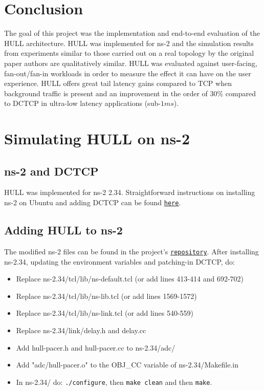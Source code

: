 \documentclass[10pt,conference,compsocconf]{IEEEtran}
\begin{document}
\section{Conclusion}
The goal of this project was the implementation and end-to-end evaluation of the HULL architecture. HULL was implemented for ns-2 and the simulation results from experiments similar to those carried out on a real topology by the original paper authors are qualitatively similar. HULL was evaluated against user-facing, fan-out/fan-in workloads in order to measure the effect it can have on the user experience. HULL offers great tail latency gains compared to TCP when background traffic is present and an improvement in the order of $30\%$ compared to DCTCP in ultra-low latency applications (sub-$1ms$).
\vspace{15pt}








\vspace{15pt}
\appendix

\section*{Simulating HULL on ns-2}

\subsection{ns-2 and DCTCP}
HULL was implemented for ns-2 2.34. Straightforward instructions on installing ns-2 on Ubuntu and adding DCTCP can be found \href{https://www.cl.cam.ac.uk/research/srg/netos/qjump/nsdi2015/figure9.html}{\texttt{here}}.

\subsection{Adding HULL to ns-2}
The modified ns-2 files can be found in the project's \href{https://github.com/konspras/Implementation-and-end-to-end-Evaluation-of-the-HULL-Architecture}{\texttt{repository}}. After installing ns-2.34, updating the environment variables and patching-in DCTCP, do:
\begin{itemize}
    \item Replace ns-2.34/tcl/lib/ns-default.tcl (or add lines 413-414 and 692-702)
    \item Replace ns-2.34/tcl/lib/ns-lib.tcl (or add lines 1569-1572)
    \item Replace ns-2.34/tcl/lib/ns-link.tcl (or add lines 540-559)
    \item Replace ns-2.34/link/delay.h and delay.cc
    \item Add hull-pacer.h and hull-pacer.cc to ns-2.34/adc/
    \item Add "adc/hull-pacer.o" to the OBJ\_CC variable of ns-2.34/Makefile.in
    \item In ns-2.34/ do: \texttt{./configure}, then \texttt{make clean} and then \texttt{make}.
\end{itemize}
 
\end{document}

